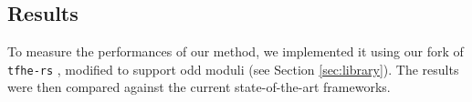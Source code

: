 


\subsection{Results}
To measure the performances of our method, we implemented it using our fork of \texttt{tfhe-rs} \cite{tfhe-rs}, modified to support odd moduli (see Section \ref{sec:library}). The results were then compared against the current state-of-the-art frameworks.

